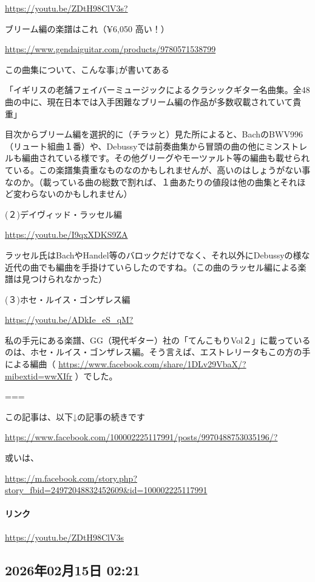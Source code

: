 \url{https://youtu.be/ZDtH98ClV3s?}

ブリーム編の楽譜はこれ（¥6,050 高い！）

\url{https://www.gendaiguitar.com/products/9780571538799}

この曲集について、こんな事↓が書いてある

「イギリスの老舗フェイバーミュージックによるクラシックギター名曲集。全48曲の中に、現在日本では入手困難なブリーム編の作品が多数収載されていて貴重」

目次からブリーム編を選択的に（チラッと）見た所によると、BachのBWV996（リュート組曲１番）や、Debussyでは前奏曲集から冒頭の曲の他にミンストレルも編曲されている様です。その他グリーグやモーツァルト等の編曲も載せられている。この楽譜集貴重なものなのかもしれませんが、高いのはしょうがない事なのか。（載っている曲の総数で割れば、１曲あたりの値段は他の曲集とそれほど変わらないのかもしれません）

(２)デイヴィッド・ラッセル編

\url{https://youtu.be/I9qxXDKS9ZA}

ラッセル氏はBachやHandel等のバロックだけでなく、それ以外にDebussyの様な近代の曲でも編曲を手掛けていらしたのですね。（この曲のラッセル編による楽譜は見つけられなかった）

(３)ホセ・ルイス・ゴンザレス編

\url{https://youtu.be/ADkIe_eS_qM?}

私の手元にある楽譜、GG（現代ギター）社の「てんこもりVol２」に載っているのは、ホセ・ルイス・ゴンザレス編。そう言えば、エストレリータもこの方の手による編曲（ \url{https://www.facebook.com/share/1DLv29VbaX/?mibextid=wwXIfr} ）でした。

===

この記事は、以下↓の記事の続きです

\url{https://www.facebook.com/100002225117991/posts/9970488753035196/?}

或いは、

\url{https://m.facebook.com/story.php?story_fbid=24972048832452609&id=100002225117991}

\paragraph{リンク}
\url{https://youtu.be/ZDtH98ClV3s}

\subsection*{2026年02月15日 02:21}

